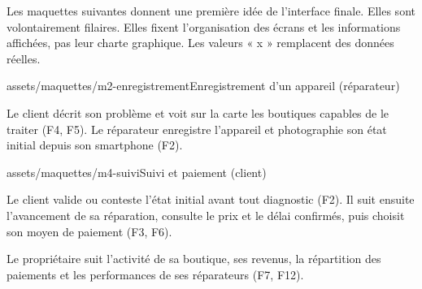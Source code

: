 
Les maquettes suivantes donnent une première idée de l’interface finale. Elles sont volontairement filaires. Elles fixent l’organisation des écrans et les informations affichées, pas leur charte graphique. Les valeurs « x » remplacent des données réelles.

%
             {assets/maquettes/m2-enregistrement}{Enregistrement d’un appareil (réparateur)}

Le client décrit son problème et voit sur la carte les boutiques capables de le traiter (F4, F5). Le réparateur enregistre l’appareil et photographie son état initial depuis son smartphone (F2).

%
             {assets/maquettes/m4-suivi}{Suivi et paiement (client)}

Le client valide ou conteste l’état initial avant tout diagnostic (F2). Il suit ensuite l’avancement de sa réparation, consulte le prix et le délai confirmés, puis choisit son moyen de paiement (F3, F6).


Le propriétaire suit l’activité de sa boutique, ses revenus, la répartition des paiements et les performances de ses réparateurs (F7, F12).
